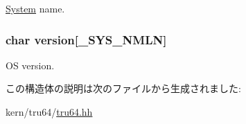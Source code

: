 \hyperlink{classSystem}{System} name. \hypertarget{structTru64_1_1utsname_a1e88526d3e96aa25d88df1541dafe922}{
\subsubsection[{version}]{\setlength{\rightskip}{0pt plus 5cm}char {\bf version}\mbox{[}{\bf \_\-SYS\_\-NMLN}\mbox{]}}}
\label{structTru64_1_1utsname_a1e88526d3e96aa25d88df1541dafe922}


OS version. 

この構造体の説明は次のファイルから生成されました:\begin{DoxyCompactItemize}
\item 
kern/tru64/\hyperlink{kern_2tru64_2tru64_8hh}{tru64.hh}\end{DoxyCompactItemize}
